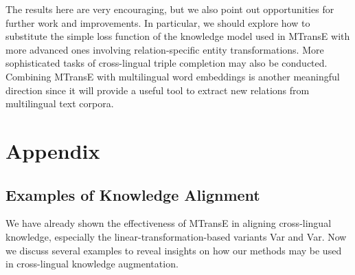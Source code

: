 \documentclass{article}
\begin{document}
The results here are very encouraging, but we also point out opportunities for further work and improvements. In particular, we
should explore how to substitute the simple loss function of the knowledge model used in MTransE with more advanced ones involving relation-specific entity transformations.
More sophisticated tasks of cross-lingual triple completion may also be conducted.
Combining MTransE with multilingual word embeddings \cite{xing2015normalized}
is another meaningful direction since it will provide a useful tool to extract new relations from multilingual text corpora.



\begingroup

\endgroup
\clearpage



\newpage
\section{Appendix}
\subsection{Examples of Knowledge Alignment}		

We have already shown the effectiveness of MTransE in aligning cross-lingual knowledge, 		
especially the linear-transformation-based variants Var and Var.
Now we discuss several examples to reveal insights on how our methods may be used in cross-lingual knowledge augmentation.		\par
\end{document}

